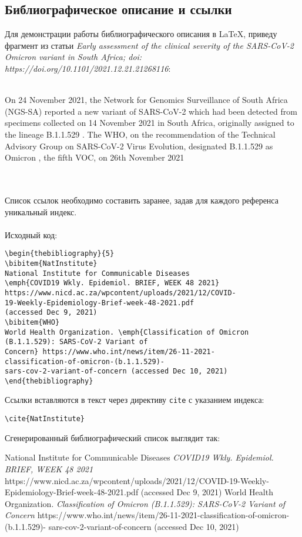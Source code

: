 \documentclass[a4paper]{article}
\newcommand{\cbox}[2][green]{%
  \colorbox{#1}{\parbox{\dimexpr\linewidth-2\fboxsep}{#2}}%
}
\begin{document}
\newpage
\subsection{Библиографическое описание и ссылки}
Для демонстрации работы библиографического описания в \LaTeX, приведу фрагмент из статьи \emph{Early assessment of the clinical severity of the SARS-CoV-2 Omicron variant in South Africa; doi: https://doi.org/10.1101/2021.12.21.21268116}:
\\
\\
\cbox[lightgray!20]{On 24 November 2021, the Network for Genomics Surveillance of South Africa (NGS-SA) reported a new variant of SARS-CoV-2 which had been detected from specimens collected on 14 November 2021 in South Africa, originally assigned to the lineage B.1.1.529 \cite{NatInstitute}. The WHO, on the recommendation of the Technical Advisory Group on SARS-CoV-2 Virus Evolution, designated B.1.1.529 as Omicron \cite{WHO}, the fifth VOC, on 26th November 2021}
\\\\
Список ссылок необходимо составить заранее, задав для каждого референса уникальный индекс. \\\\
Исходный код:
\begin{lstlisting}
\begin{thebibliography}{5}
\bibitem{NatInstitute}
National Institute for Communicable Diseases 
\emph{COVID19 Wkly. Epidemiol. BRIEF, WEEK 48 2021} 
https://www.nicd.ac.za/wpcontent/uploads/2021/12/COVID-
19-Weekly-Epidemiology-Brief-week-48-2021.pdf 
(accessed Dec 9, 2021)
\bibitem{WHO}
World Health Organization. \emph{Classification of Omicron 
(B.1.1.529): SARS-CoV-2 Variant of
Concern} https://www.who.int/news/item/26-11-2021-
classification-of-omicron-(b.1.1.529)-
sars-cov-2-variant-of-concern (accessed Dec 10, 2021)
\end{thebibliography}
\end{lstlisting}\hfill\break
Ссылки вставляются в текст через директиву \lstinline{cite} с указанием индекса:
\begin{lstlisting}
\cite{NatInstitute}
\end{lstlisting}
\thispagestyle{empty}
\newpage
Сгенерированный библиографический список выглядит так:\\
\cbox[lightgray!20]{
	\begin{thebibliography}{5}
		\bibitem{NatInstitute}
		National Institute for Communicable Diseases \emph{COVID19 Wkly. Epidemiol. BRIEF, WEEK 48 2021} https://www.nicd.ac.za/wpcontent/uploads/2021/12/COVID-19-Weekly-Epidemiology-Brief-week-48-2021.pdf (accessed Dec 9, 2021)
		\bibitem{WHO}
		World Health Organization. \emph{Classification of Omicron (B.1.1.529): SARS-CoV-2 Variant of
		Concern} https://www.who.int/news/item/26-11-2021-classification-of-omicron-(b.1.1.529)-
		sars-cov-2-variant-of-concern (accessed Dec 10, 2021)
	\end{thebibliography}
}
\end{document}

